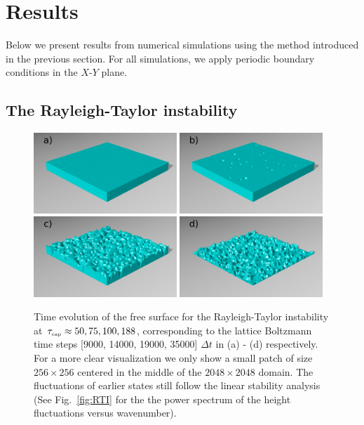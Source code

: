 \section{Results}\label{sec:results}
Below we present results from numerical simulations using the method introduced in the previous section. For all simulations, we apply periodic boundary conditions in the $X$-$Y$ plane.
\subsection{The Rayleigh-Taylor instability}

\begin{figure}
    \includegraphics[width=0.48\textwidth]{graphics/Fig_2_1_rti_renders_a).png}
    \includegraphics[width=0.48\textwidth]{graphics/Fig_2_2_rti_renders_b).png}
    \includegraphics[width=0.48\textwidth]{graphics/Fig_2_3_rti_renders_c).png}
    \includegraphics[width=0.48\textwidth]{graphics/Fig_2_4_rti_renders_d).png}
  \caption{Time evolution of the free surface for the Rayleigh-Taylor instability at $\tau_{\mbox{\tiny{cap}}}\approx50, 75, 100, 188$, corresponding to the lattice Boltzmann time steps [9000, 14000, 19000, 35000] $\Delta t$ in (a) - (d) respectively. For a more clear visualization we only show a small patch of size $256\times256$ centered in the middle of the $2048\times 2048$ domain. The fluctuations of earlier states still follow the linear stability analysis (See Fig.~\ref{fig:RTI} for the the power spectrum  of the  height fluctuations versus wavenumber).}
  \label{fig:RTI_evolution}
\end{figure}



